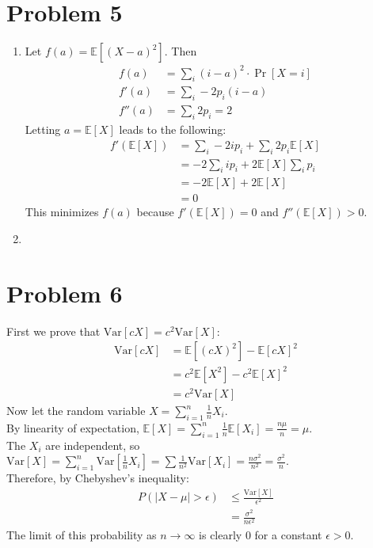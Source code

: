 \documentclass[11pt]{article}
\newcommand{\E}{\mathbb{E}}
\newcommand{\Var}{\text{Var}}
\begin{document}
\newpage
\section*{Problem 5}
\begin{enumerate}[1.]
\item Let $f(a)=\E[(X-a)^2]$. Then \begin{align*}
f(a) &= \sum_i (i-a)^2\cdot \Pr[X=i]\\
f'(a) &= \sum_i -2p_i(i-a)\\
f''(a) &= \sum_i 2p_i = 2
\end{align*}
Letting $a=\E[X]$ leads to the following: \begin{align*}
f'(\E[X]) &= \sum_i -2ip_i + \sum_i 2p_i\E[X]\\
&= -2\sum_i ip_i + 2\E[X]\sum_i p_i\\
&= -2\E[X] + 2\E[X]\\
&= 0
\end{align*}
This minimizes $f(a)$ because $f'(\E[X])=0$ and $f''(\E[X])>0$.
\item 
\end{enumerate}


\newpage
\section*{Problem 6}
First we prove that $\Var[cX]=c^2\Var[X]$: \begin{align*}
\Var[cX] &= \E[(cX)^2] - \E[cX]^2\\
&= c^2\E[X^2] - c^2\E[X]^2\\
&= c^2\Var[X]
\end{align*}
Now let the random variable $X=\sum_{i=1}^n \frac1n X_i$.\\
By linearity of expectation, $\E[X]=\sum_{i=1}^n \frac1n \E[X_i] = \frac{n\mu}n = \mu$.\\
The $X_i$ are independent, so $\Var[X] = \sum_{i=1}^n \Var[\frac1n X_i] = \sum \frac1{n^2}\Var[X_i] = \frac{n\sigma^2}{n^2} = \frac{\sigma^2}n$.\\
Therefore, by Chebyshev's inequality: \begin{align*}
P(|X-\mu| > \epsilon) &\leq \frac{\Var[X]}{\epsilon^2}\\
&= \frac{\sigma^2}{n\epsilon^2}
\end{align*}
The limit of this probability as $n\rightarrow\infty$ is clearly $0$ for a constant $\epsilon > 0$.
\end{document}
